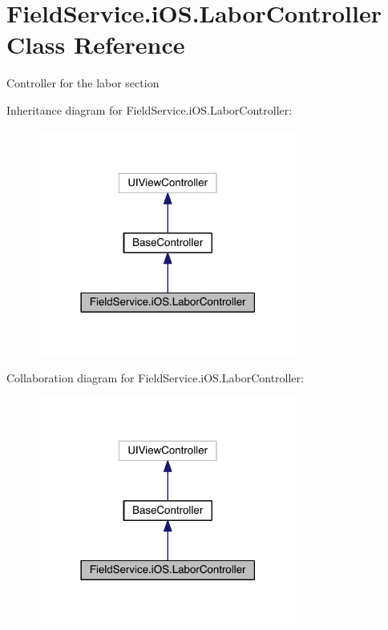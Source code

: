 \hypertarget{class_field_service_1_1i_o_s_1_1_labor_controller}{\section{Field\+Service.\+i\+O\+S.\+Labor\+Controller Class Reference}
\label{class_field_service_1_1i_o_s_1_1_labor_controller}
}


Controller for the labor section  




Inheritance diagram for Field\+Service.\+i\+O\+S.\+Labor\+Controller\+:
\nopagebreak
\begin{figure}[H]
\begin{center}
\leavevmode
\includegraphics[width=242pt]{class_field_service_1_1i_o_s_1_1_labor_controller__inherit__graph}
\end{center}
\end{figure}


Collaboration diagram for Field\+Service.\+i\+O\+S.\+Labor\+Controller\+:
\nopagebreak
\begin{figure}[H]
\begin{center}
\leavevmode
\includegraphics[width=242pt]{class_field_service_1_1i_o_s_1_1_labor_controller__coll__graph}
\end{center}
\end{figure}
